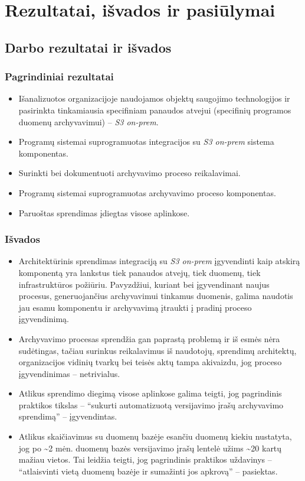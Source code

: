 \section{Rezultatai, išvados ir pasiūlymai}

\subsection{Darbo rezultatai ir išvados}

\subsubsection*{Pagrindiniai rezultatai}

\begin{itemize}
    \item Išanalizuotos organizacijoje naudojamos objektų saugojimo technologijos ir pasirinkta tinkamiausia specifiniam panaudos atvejui (specifinių programos duomenų archyvavimui) -- \textit{S3 on-prem}.
    \item Programų sistemai suprogramuotas integracijos su \textit{S3 on-prem} sistema komponentas.
    \item Surinkti bei dokumentuoti archyvavimo proceso reikalavimai.
    \item Programų sistemai suprogramuotas archyvavimo proceso komponentas.
    \item Paruoštas sprendimas įdiegtas visose aplinkose.
\end{itemize}

\subsubsection*{Išvados}

\begin{itemize}
    \item Architektūrinis sprendimas integraciją su \textit{S3 on-prem} įgyvendinti kaip atskirą komponentą yra lankstus tiek panaudos atvejų, tiek duomenų, tiek infrastruktūros požiūriu. Pavyzdžiui, kuriant bei įgyvendinant naujus procesus, generuojančius archyvavimui tinkamus duomenis, galima naudotis jau esamu komponentu ir archyvavimą įtraukti į pradinį proceso įgyvendinimą.
    \item Archyvavimo procesas sprendžia gan paprastą problemą ir iš esmės nėra sudėtingas, tačiau surinkus reikalavimus iš naudotojų, sprendimų architektų, organizacijos vidinių tvarkų bei teisės aktų tampa akivaizdu, jog proceso įgyvendinimas -- netrivialus.
    \item Atlikus sprendimo diegimą visose aplinkose galima teigti, jog pagrindinis praktikos tikslas -- \enquote{sukurti automatizuotą versijavimo įrašų archyvavimo sprendimą} -- įgyvendintas.
    \item Atlikus skaičiavimus su duomenų bazėje esančiu duomenų kiekiu nustatyta, jog po \sim  2 mėn. duomenų bazės versijavimo įrašų lentelė užims \sim 20 kartų mažiau vietos. Tai leidžia teigti, jog pagrindinis praktikos uždavinys -- \enquote{atlaisvinti vietą duomenų bazėje ir sumažinti jos apkrovą} -- pasiektas.
\end{itemize}

